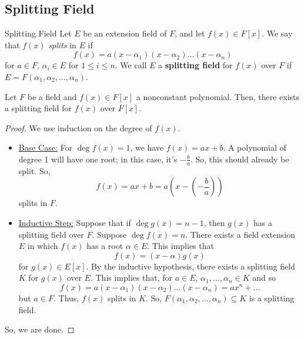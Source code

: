 \documentclass[letterpaper]{article}
\begin{document}
\subsection{Splitting Field}
\begin{definition}{Splitting Field}{}
    Let $E$ be an extension field of $F$, and let $f(x) \in F[x]$. We say that $f(x)$ \emph{splits} in $E$ if 
    \[f(x) = a(x - \alpha_1)(x - \alpha_2) \dots (x - \alpha_n)\]
    for $a \in F$, $\alpha_i \in E$ for $1 \leq i \leq n$. We call $E$ a \textbf{splitting field} for $f(x)$ over $F$ if $E = F(\alpha_1, \alpha_2, \dots, \alpha_n)$. 
\end{definition}

\begin{theorem}{}{}
    Let $F$ be a field and $f(x) \in F[x]$ a nonconstant polynomial. Then, there exists a splitting field for $f(x)$ over $F[x]$. 
\end{theorem}

\begin{mdframed}[]
    \begin{proof}
        We use induction on the degree of $f(x)$. 
        \begin{itemize}
            \item \underline{Base Case:} For $\deg f(x) = 1$, we have $f(x) = ax + b$. A polynomial of degree 1 will have one root; in this case, it's $-\frac{b}{a}$. So, this should already be split. So,
            \[f(x) = ax + b = a\left(x - \left(-\frac{b}{a}\right)\right)\]
            splits in $F$. 

            \item \underline{Inductive Step:} Suppose that if $\deg g(x) = n - 1$, then $g(x)$ has a splitting field over $F$. Suppose $\deg f(x) = n$. There exists a field extension $E$ in which $f(x)$ has a root $\alpha \in E$. This implies that 
            \[f(x) = (x - \alpha) g(x)\]
            for $g(x) \in E[x]$. By the inductive hypothesis, there exists a splitting field $K$ for $g(x)$ over $E$. This implies that, for $a \in E$, $\alpha_1, \dots, \alpha_n \in K$ and so 
            \[f(x) = a(x - \alpha_1)(x - \alpha_2) \dots (x - \alpha_n) = ax^n + \dots\]
            but $a \in F$. Thus, $f(x)$ splits in $K$. So, $F(\alpha_1, \alpha_2, \dots, \alpha_n) \subseteq K$ is a splitting field. 
        \end{itemize}
        So, we are done. 
    \end{proof}
\end{mdframed}
\end{document}
